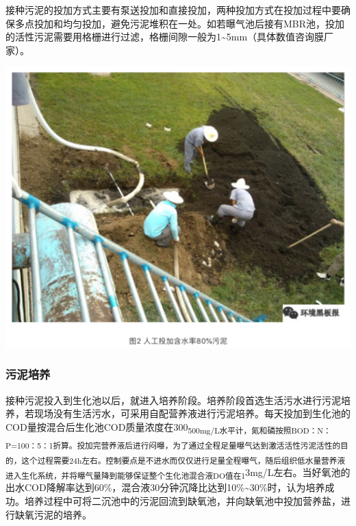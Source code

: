 \documentclass[]{book}
\begin{document}
接种污泥的投加方式主要有泵送投加和直接投加，两种投加方式在投加过程中要确保多点投加和均匀投加，避免污泥堆积在一处。如若曝气池后接有MBR池，投加的活性污泥需要用格栅进行过滤，格栅间隙一般为1\textasciitilde{}5mm（具体数值咨询膜厂家）。

\includegraphics[width=6.67in]{images/ao2}

\hypertarget{ux6c61ux6ce5ux57f9ux517b}{%
\subsubsection{污泥培养}\label{ux6c61ux6ce5ux57f9ux517b}}

接种污泥投入到生化池以后，就进入培养阶段。培养阶段首选生活污水进行污泥培养，若现场没有生活污水，可采用自配营养液进行污泥培养。每天投加到生化池的COD量按混合后生化池COD质量浓度在300\textsubscript{500mg/L水平计，氮和磷按照BOD：N：P=100：5：1折算。投加完营养液后进行闷曝，为了通过全程足量曝气达到激活活性污泥活性的目的，这个过程需要24h左右。控制要点是不进水而仅仅进行足量全程曝气，随后组织低水量营养液进入生化系统，并将曝气量降到能够保证整个生化池混合液DO值在1}3mg/L左右。当好氧池的出水COD降解率达到60\%，混合液30分钟沉降比达到10\%\textasciitilde{}30\%时，认为培养成功。培养过程中可将二沉池中的污泥回流到缺氧池，并向缺氧池中投加营养盐，进行缺氧污泥的培养。
\end{document}
